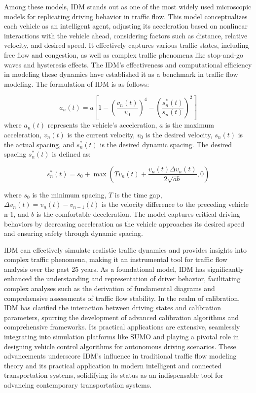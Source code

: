 \documentclass[a4paper,fleqn]{cas-sc}
\begin{document}
Among these models, IDM stands out as one of the most widely used microscopic models for replicating driving behavior in traffic flow. This model conceptualizes each vehicle as an intelligent agent, adjusting its acceleration based on nonlinear interactions with the vehicle ahead, considering factors such as distance, relative velocity, and desired speed. It effectively captures various traffic states, including free flow and congestion, as well as complex traffic phenomena like stop-and-go waves and hysteresis effects. The IDM's effectiveness and computational efficiency in modeling these dynamics have established it as a benchmark in traffic flow modeling. The formulation of IDM is as follows:

\begin{equation}
a_n(t) = a \left[ 1 - \left( \frac{v_n(t)}{v_0} \right)^4 - \left( \frac{s^*_n(t)}{s_n(t)} \right)^2 \right]
\label{equ:IDM1}
\end{equation}
where \( a_n(t) \) represents the vehicle's acceleration, \( a \) is the maximum acceleration, \( v_n(t) \) is the current velocity, \( v_0 \) is the desired velocity, \( s_n(t) \) is the actual spacing, and \( s^*_n(t) \) is the desired dynamic spacing. The desired spacing \( s^*_n(t) \) is defined as:

\begin{equation}
s^*_n(t) = s_0 + \max \left( T v_n(t) + \frac{v_n(t) \Delta v_n(t)}{2\sqrt{ab}}, 0 \right)
\label{equ:IDM2}
\end{equation}

where \( s_0 \) is the minimum spacing, \( T \) is the time gap, \( \Delta v_n(t) = v_n(t) - v_{n-1}(t) \) is the velocity difference to the preceding vehicle n-1, and \( b \) is the comfortable deceleration. The model captures critical driving behaviors by decreasing acceleration as the vehicle approaches its desired speed and ensuring safety through dynamic spacing. 


IDM can effectively simulate realistic traffic dynamics and provides insights into complex traffic phenomena, making it an instrumental tool for traffic flow analysis over the past 25 years. As a foundational model, IDM has significantly enhanced the understanding and representation of driver behavior, facilitating complex analyses such as the derivation of fundamental diagrams and comprehensive assessments of traffic flow stability. In the realm of calibration, IDM has clarified the interaction between driving states and calibration parameters, spurring the development of advanced calibration algorithms and comprehensive frameworks. Its practical applications are extensive, seamlessly integrating into simulation platforms like SUMO and playing a pivotal role in designing vehicle control algorithms for autonomous driving scenarios. These advancements underscore IDM's influence in traditional traffic flow modeling theory and its practical application in modern intelligent and connected transportation systems, solidifying its status as an indispensable tool for advancing contemporary transportation systems.
\end{document}
